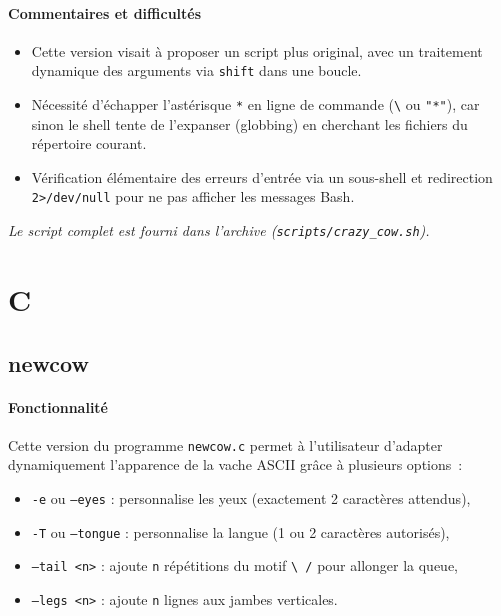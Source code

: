 \documentclass[a4paper,french,11pt]{article}
\begin{document}
\paragraph{Commentaires et difficultés}
\begin{itemize}
  \item Cette version visait à proposer un script plus original, avec un traitement dynamique des arguments via \texttt{shift} dans une boucle.
  \item Nécessité d’échapper l’astérisque \texttt{*} en ligne de commande (\texttt{\textbackslash*} ou \texttt{"*"}), car sinon le shell tente de l’expanser (globbing) en cherchant les fichiers du répertoire courant.
  \item Vérification élémentaire des erreurs d’entrée via un sous-shell et redirection \texttt{2>/dev/null} pour ne pas afficher les messages Bash.
\end{itemize}

\medskip
\noindent\emph{Le script complet est fourni dans l’archive (\texttt{scripts/crazy\_cow.sh}).}

\newpage

\section{C}

\subsection{newcow}

\paragraph{Fonctionnalité}  
Cette version du programme \texttt{newcow.c} permet à l'utilisateur d'adapter dynamiquement l'apparence de la vache ASCII grâce à plusieurs options :
\begin{itemize}
  \item \texttt{-e} ou \texttt{--eyes} : personnalise les yeux (exactement 2 caractères attendus),
  \item \texttt{-T} ou \texttt{--tongue} : personnalise la langue (1 ou 2 caractères autorisés),
  \item \texttt{--tail <n>} : ajoute \texttt{n} répétitions du motif \verb|\ /| pour allonger la queue,
  \item \texttt{--legs <n>} : ajoute \texttt{n} lignes aux jambes verticales.
\end{itemize}
\end{document}
